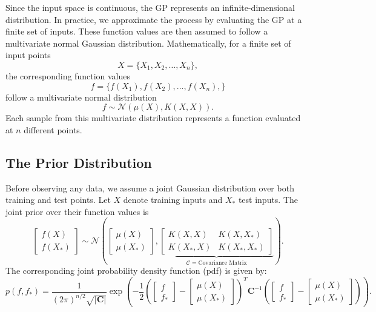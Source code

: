 \documentclass{ucdgradtaughtthesis}
\begin{document}
Since the input space is continuous, the GP represents an infinite-dimensional distribution. 
In practice, we approximate the process by evaluating the GP at a finite set of inputs.
These function values are then assumed to follow a multivariate normal Gaussian distribution.
%
Mathematically, for a finite set of input points
\begin{equation}
X = \{X_1, X_2, \dots, X_n\},
\end{equation}
 the corresponding function values
\begin{equation}
f = \{f(X_1),f(X_2),...,f(X_n), \}
\end{equation}
follow a multivariate normal distribution
\begin{equation}
f \sim \mathcal{N}\left(\mu(X), K(X, X)\right).
\label{eq: Multivariate_distribution}
\end{equation}
Each sample from this multivariate distribution represents a function evaluated at \( n \) different points.

\subsection{The Prior Distribution}
\label{sec: prior_dist}
Before observing any data, we assume a joint Gaussian distribution over both training and test points. Let \( X \) denote training inputs and \( X_* \) test inputs. 
The joint prior over their function values is
\begin{equation}
\begin{bmatrix}
f(X) \\
f(X_*)
\end{bmatrix}
\sim \mathcal{N}
\left(
\begin{bmatrix}
\mu(X) \\
\mu(X_*)
\end{bmatrix},
\underbrace{
\begin{bmatrix}
K(X, X) & K(X, X_*) \\
K(X_*, X) & K(X_*, X_*)
\end{bmatrix}
}_{\mathcal{C} = \text{Covariance Matrix}}\right).
\label{eq: Multivariate prior}
\end{equation}
%
The corresponding joint probability density function (pdf) is given by:
%
\begin{equation}
    p(f, f_*) = \frac{1}{(2\pi)^{n/2} \sqrt{|\mathbf{C}|}} \exp\left( 
    - \frac{1}{2}\left(\begin{bmatrix}f \\f_*\end{bmatrix}-
    \begin{bmatrix}\mu(X) \\\mu(X_*)\end{bmatrix}\right)^T
    \mathbf{C}^{-1}\left(
    \begin{bmatrix}f \\f_*\end{bmatrix}-
    \begin{bmatrix}\mu(X) \\\mu(X_*)\end{bmatrix}\right)\right).
\end{equation}
%
\end{document}
